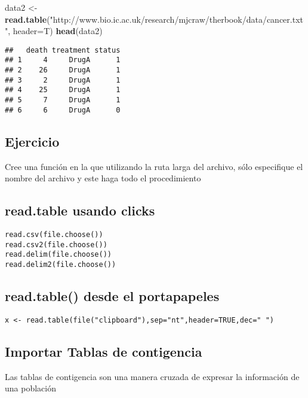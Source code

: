 \documentclass[]{article}
\newenvironment{Shaded}{\begin{snugshade}}{\end{snugshade}}
\newcommand{\KeywordTok}[1]{\textcolor[rgb]{0.13,0.29,0.53}{\textbf{#1}}}
\newcommand{\DataTypeTok}[1]{\textcolor[rgb]{0.13,0.29,0.53}{#1}}
\newcommand{\StringTok}[1]{\textcolor[rgb]{0.31,0.60,0.02}{#1}}
\newcommand{\NormalTok}[1]{#1}
\begin{document}
\begin{Shaded}
\begin{Highlighting}[]
\NormalTok{data2 <-}\StringTok{ }\KeywordTok{read.table}\NormalTok{(}\StringTok{"http://www.bio.ic.ac.uk/research/mjcraw/therbook/data/cancer.txt"}\NormalTok{, }\DataTypeTok{header=}\NormalTok{T)}
\KeywordTok{head}\NormalTok{(data2)}
\end{Highlighting}
\end{Shaded}

\begin{verbatim}
##   death treatment status
## 1     4     DrugA      1
## 2    26     DrugA      1
## 3     2     DrugA      1
## 4    25     DrugA      1
## 5     7     DrugA      1
## 6     6     DrugA      0
\end{verbatim}

\subsection{Ejercicio}\label{ejercicio}

Cree una función en la que utilizando la ruta larga del archivo, sólo
especifique el nombre del archivo y este haga todo el procedimiento

\subsection{read.table usando clicks}\label{read.table-usando-clicks}

\begin{verbatim}
read.csv(file.choose())
read.csv2(file.choose())
read.delim(file.choose())
read.delim2(file.choose())
\end{verbatim}

\subsection{read.table() desde el
portapapeles}\label{read.table-desde-el-portapapeles}

\begin{verbatim}
x <- read.table(file("clipboard"),sep="nt",header=TRUE,dec=" ")
\end{verbatim}

\subsection{Importar Tablas de
contigencia}\label{importar-tablas-de-contigencia}

Las tablas de contigencia son una manera cruzada de expresar la
información de una población
\end{document}
